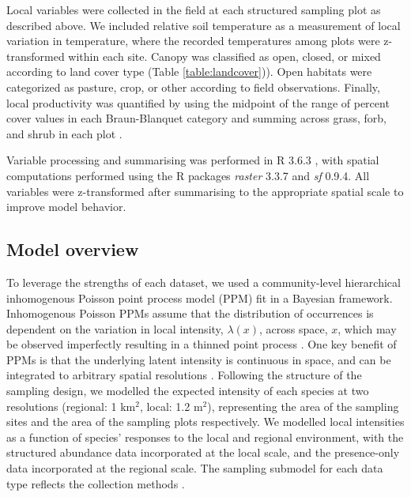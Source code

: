 \documentclass[preprint,final,times,12pt,3p]{elsarticle}
\begin{document}
Local variables were collected in the field at each structured sampling plot as described above. We included relative soil temperature as a measurement of local variation in temperature, where the recorded temperatures among plots were z-transformed within each site. Canopy was classified as open, closed, or mixed according to land cover type (Table \ref{table:landcover})). Open habitats were categorized as pasture, crop, or other according to field observations. Finally, local productivity was quantified by using the midpoint of the range of percent cover values in each Braun-Blanquet category and summing across grass, forb, and shrub in each plot \citep{Douglas1978,Mccain2018,Szewczyk2018}.

Variable processing and summarising was performed in R 3.6.3 \citep{R-3-6-3}, with spatial computations performed using the R packages \emph{raster} 3.3.7 and \emph{sf} 0.9.4. All variables were z-transformed after summarising to the appropriate spatial scale to improve model behavior.


\subsection{Model overview}
To leverage the strengths of each dataset, we used a community-level hierarchical inhomogenous Poisson point process model (PPM) fit in a Bayesian framework. Inhomogenous Poisson PPMs assume that the distribution of occurrences is dependent on the variation in local intensity, $\lambda(x)$, across space, $x$, which may be observed imperfectly resulting in a thinned point process \citep{Warton2010,Baddeley2015,Fithian2015}. One key benefit of PPMs is that the underlying latent intensity is continuous in space, and can be integrated to arbitrary spatial resolutions \citep{Renner2015,Hefley2016,Koshkina2017a,Fletcher2019}. Following the structure of the sampling design, we modelled the expected intensity of each species at two resolutions (regional: 1 km$^2$, local: 1.2 m$^2$), representing the area of the sampling sites and the area of the sampling plots respectively. We modelled local intensities as a function of species' responses to the local and regional environment, with the structured abundance data incorporated at the local scale, and the presence-only data incorporated at the regional scale. The sampling submodel for each data type reflects the collection methods \citep{Isaac2014,Hefley2016,Fletcher2019,Miller2019}.
\end{document}
